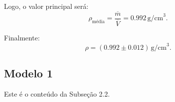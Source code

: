 \documentclass{article}
\begin{document}
\begin{multicols*}{2}
        Logo, o valor principal será:
\begin{equation}
\rho_{\text{média}} = \frac{\overline{m}}{\overline{V}} = 0.992 \, \text{g/cm}^3.
\end{equation}

Finalmente:
\begin{equation}
\rho = (0.992 \pm 0.012) \, \text{g/cm}^3.
\end{equation}

        
    \subsection{Modelo 1}
    Este é o conteúdo da Subseção 2.2.
    
    \end{multicols*} %
    
    
\end{document}
